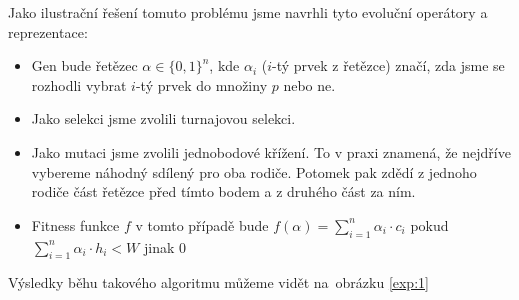 Jako ilustrační řešení tomuto problému jsme navrhli tyto evoluční operátory a reprezentace:
\begin{itemize}
    \item Gen bude řetězec $\alpha \in \{0,1\}^n$, kde $\alpha_i$ ($i$-tý prvek z řetězce) značí, zda jsme se rozhodli vybrat $i$-tý prvek do množiny $p$ nebo ne.
    \item Jako selekci jsme zvolili turnajovou selekci.
    \item Jako mutaci jsme zvolili jednobodové křížení. To v praxi znamená, že nejdříve vybereme náhodný sdílený pro oba rodiče. Potomek pak zdědí z jednoho rodiče část řetězce před tímto bodem a z druhého část za ním. 
    \item Fitness funkce $f$ v tomto případě bude $f(\alpha) = \sum_{i=1}^n \alpha_i \cdot c_i$ pokud $\sum_{i=1}^n \alpha_i \cdot h_i < W$ jinak $0$
\end{itemize}

Výsledky běhu takového algoritmu můžeme vidět na~obrázku \ref{exp:1}

